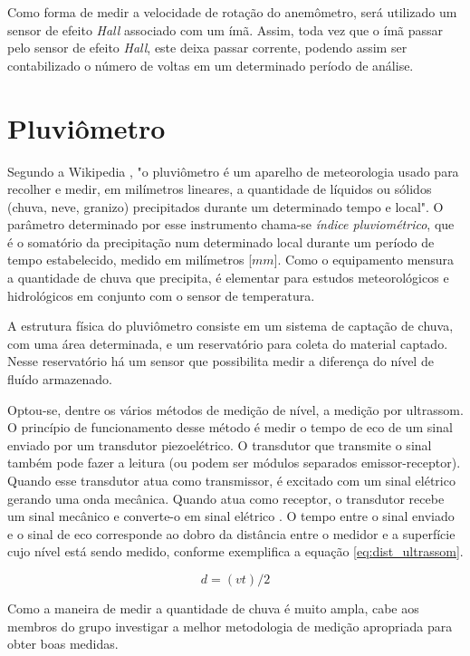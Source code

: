 \documentclass[12pt,a4paper]{instrumentacao}
\begin{document}
Como forma de medir a velocidade de rotação do anemômetro, será utilizado um sensor de efeito \textit{Hall} associado com um ímã. Assim, toda vez que o ímã passar pelo sensor de efeito \textit{Hall}, este deixa passar corrente, podendo assim ser contabilizado o número de voltas em um determinado período de análise.


\section{Pluviômetro}
Segundo a Wikipedia \cite{pluviometro}, "o pluviômetro é um aparelho de meteorologia usado para recolher e medir, em milímetros lineares, a quantidade de líquidos ou sólidos (chuva, neve, granizo) precipitados durante um determinado tempo e local". O parâmetro determinado por esse instrumento chama-se \textit{índice pluviométrico}, que é o somatório da precipitação num determinado local durante um período de tempo estabelecido, medido em milímetros [$mm$]. Como o equipamento mensura a quantidade de chuva que precipita, é elementar para estudos meteorológicos e hidrológicos em conjunto com o sensor de temperatura.

A estrutura física do pluviômetro consiste em um sistema de captação de chuva, com uma área determinada, e um reservatório para coleta do material captado. Nesse reservatório há um sensor que possibilita medir a diferença do nível de fluído armazenado.

Optou-se, dentre os vários métodos de medição de nível, a medição por ultrassom. O princípio de funcionamento desse método é medir o tempo de eco de um sinal enviado por um transdutor piezoelétrico. O transdutor que transmite o sinal também pode fazer a leitura (ou podem ser módulos separados emissor-receptor). Quando esse transdutor atua como transmissor, é excitado com um sinal elétrico gerando uma onda mecânica. Quando atua como receptor, o transdutor recebe um sinal mecânico e converte-o em sinal elétrico \cite{livro-texto}. O tempo entre o sinal enviado e o sinal de eco corresponde ao dobro da distância entre o medidor e a superfície cujo nível está sendo medido, conforme exemplifica a equação \ref{eq:dist_ultrassom}.

\begin{equation}
	d=(vt)/2
	\label{eq:dist_ultrassom}
\end{equation}

Como a maneira de medir a quantidade de chuva é muito ampla, cabe aos membros do grupo investigar a melhor metodologia de medição apropriada para obter boas medidas.
\end{document}
